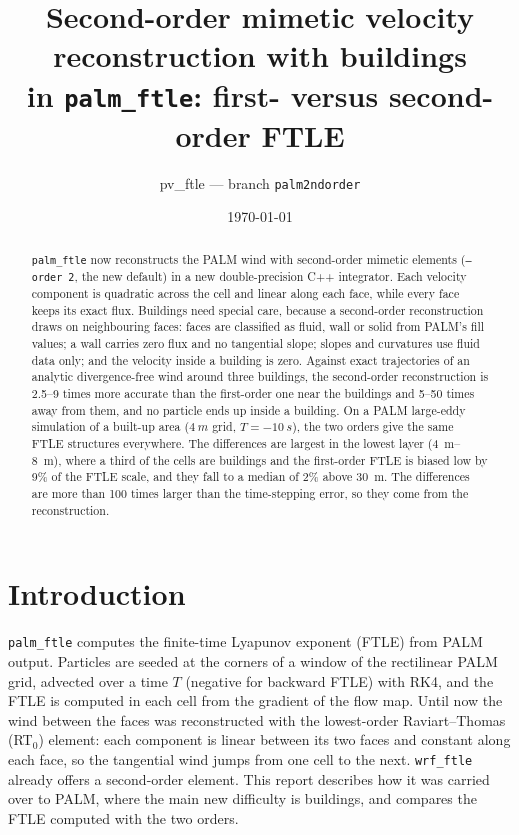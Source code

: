 \documentclass[11pt,a4paper]{article}
\title{Second-order mimetic velocity reconstruction with buildings\\
       in \texttt{palm\_ftle}: first- versus second-order FTLE}
\author{pv\_ftle --- branch \texttt{palm2ndorder}}
\date{\today}
\begin{document}
\maketitle

\begin{abstract}
\texttt{palm\_ftle} now reconstructs the PALM wind with second-order mimetic
elements (\texttt{--order 2}, the new default) in a new double-precision C++
integrator. Each velocity component is quadratic across the cell and linear
along each face, while every face keeps its exact flux. Buildings need special
care, because a second-order reconstruction draws on neighbouring faces: faces
are classified as fluid, wall or solid from PALM's fill values; a wall carries
zero flux and no tangential slope; slopes and curvatures use fluid data only;
and the velocity inside a building is zero. Against exact trajectories of an
analytic divergence-free wind around three buildings, the second-order
reconstruction is 2.5--9 times more accurate than the first-order one near the
buildings and 5--50 times away from them, and no particle ends up inside a
building. On a PALM large-eddy simulation of a built-up area
($\SI{4}{m}$ grid, $T=\SI{-10}{s}$), the two orders give the same FTLE structures
everywhere. The differences are largest in the lowest layer (\SIrange{4}{8}{m}),
where a third of the cells are buildings and the first-order FTLE is biased
low by 9\% of the FTLE scale, and they fall to a median of 2\% above
\SI{30}{m}. The differences are more than 100 times larger than the time-stepping
error, so they come from the reconstruction.
\end{abstract}

\section{Introduction}

\texttt{palm\_ftle} computes the finite-time Lyapunov exponent (FTLE) from
PALM output. Particles are seeded at the corners of a window of the
rectilinear PALM grid, advected over a time $T$ (negative for backward FTLE)
with RK4, and the FTLE is computed in each cell from the gradient of the flow
map. Until now the wind between the faces was reconstructed with the
lowest-order Raviart--Thomas (RT$_0$) element: each component is linear between
its two faces and constant along each face, so the tangential wind jumps from
one cell to the next. \texttt{wrf\_ftle} already offers a second-order element.
This report describes how it was carried over to PALM, where the main new
difficulty is buildings, and compares the FTLE computed with the two orders.
\end{document}

